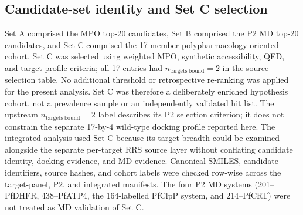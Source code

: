 \documentclass[journal=jcisd8,manuscript=article]{achemso}
\begin{document}
\subsection{Candidate-set identity and Set C selection}\label{sec:methods_cohort}
Set A comprised the MPO top-20 candidates, Set B comprised the P2 MD top-20 candidates, and Set C comprised the 17-member polypharmacology-oriented cohort. Set C was selected using weighted MPO, synthetic accessibility, QED, and target-profile criteria; all 17 entries had $n_{\mathrm{targets\ bound}}=2$ in the source selection table. No additional threshold or retrospective re-ranking was applied for the present analysis. Set C was therefore a deliberately enriched hypothesis cohort, not a prevalence sample or an independently validated hit list. The upstream $n_{\mathrm{targets\ bound}}=2$ label describes its P2 selection criterion; it does not constrain the separate 17-by-4 wild-type docking profile reported here. The integrated analysis used Set C because its target breadth could be examined alongside the separate per-target RRS source layer without conflating candidate identity, docking evidence, and MD evidence. Canonical SMILES, candidate identifiers, source hashes, and cohort labels were checked row-wise across the target-panel, P2, and integrated manifests. The four P2 MD systems (201--PfDHFR, 438--PfATP4, the 164-labelled PfClpP system, and 214--PfCRT) were not treated as MD validation of Set C.
\end{document}
